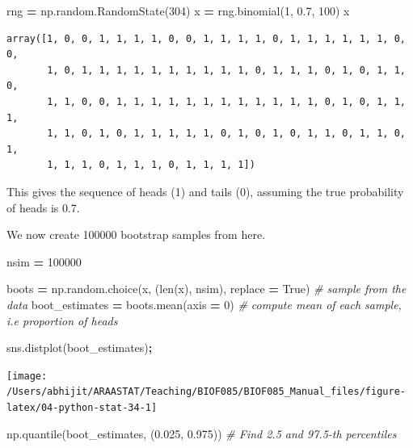 \documentclass[
  letterpaper,
]{scrbook}
\newenvironment{Shaded}{\begin{snugshade}}{\end{snugshade}}
\newcommand{\BuiltInTok}[1]{#1}
\newcommand{\CommentTok}[1]{\textcolor[rgb]{0.56,0.35,0.01}{\textit{#1}}}
\newcommand{\DecValTok}[1]{\textcolor[rgb]{0.00,0.00,0.81}{#1}}
\newcommand{\FloatTok}[1]{\textcolor[rgb]{0.00,0.00,0.81}{#1}}
\newcommand{\NormalTok}[1]{#1}
\newcommand{\OperatorTok}[1]{\textcolor[rgb]{0.81,0.36,0.00}{\textbf{#1}}}
\newcommand{\VariableTok}[1]{\textcolor[rgb]{0.00,0.00,0.00}{#1}}
\begin{document}
\begin{Shaded}
\begin{Highlighting}[]
\NormalTok{rng }\OperatorTok{=}\NormalTok{ np.random.RandomState(}\DecValTok{304}\NormalTok{)}
\NormalTok{x }\OperatorTok{=}\NormalTok{ rng.binomial(}\DecValTok{1}\NormalTok{, }\FloatTok{0.7}\NormalTok{, }\DecValTok{100}\NormalTok{)}
\NormalTok{x}
\end{Highlighting}
\end{Shaded}

\begin{verbatim}
array([1, 0, 0, 1, 1, 1, 1, 0, 0, 1, 1, 1, 1, 0, 1, 1, 1, 1, 1, 1, 0, 0,
       1, 0, 1, 1, 1, 1, 1, 1, 1, 1, 1, 1, 0, 1, 1, 1, 0, 1, 0, 1, 1, 0,
       1, 1, 0, 0, 1, 1, 1, 1, 1, 1, 1, 1, 1, 1, 1, 1, 0, 1, 0, 1, 1, 1,
       1, 1, 0, 1, 0, 1, 1, 1, 1, 1, 0, 1, 0, 1, 0, 1, 1, 0, 1, 1, 0, 1,
       1, 1, 1, 0, 1, 1, 1, 0, 1, 1, 1, 1])
\end{verbatim}

This gives the sequence of heads (1) and tails (0), assuming the true probability of heads is 0.7.

We now create 100000 bootstrap samples from here.

\begin{Shaded}
\begin{Highlighting}[]
\NormalTok{nsim }\OperatorTok{=} \DecValTok{100000}

\NormalTok{boots }\OperatorTok{=}\NormalTok{ np.random.choice(x, (}\BuiltInTok{len}\NormalTok{(x), nsim), replace }\OperatorTok{=} \VariableTok{True}\NormalTok{) }\CommentTok{# sample from the data}
\NormalTok{boot_estimates }\OperatorTok{=}\NormalTok{ boots.mean(axis }\OperatorTok{=} \DecValTok{0}\NormalTok{) }\CommentTok{# compute mean of each sample, i.e proportion of heads}

\NormalTok{sns.distplot(boot_estimates)}\OperatorTok{;}
\end{Highlighting}
\end{Shaded}

\begin{center}\texttt{[image: /Users/abhijit/ARAASTAT/Teaching/BIOF085/BIOF085\_Manual\_files/figure-latex/04-python-stat-34-1]} \end{center}

\begin{Shaded}
\begin{Highlighting}[]
\NormalTok{np.quantile(boot_estimates, (}\FloatTok{0.025}\NormalTok{, }\FloatTok{0.975}\NormalTok{)) }\CommentTok{# Find 2.5 and 97.5-th percentiles}
\end{Highlighting}
\end{Shaded}
\end{document}
